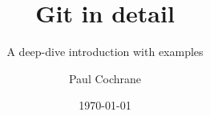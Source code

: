 \documentclass{git_course}
\title{Git in detail}
\subtitle{A deep-dive introduction with examples}
\author{Paul Cochrane}
\date{\today}
\begin{document}
\begin{frame}
    \titlepage{}
\end{frame}
\end{document}
